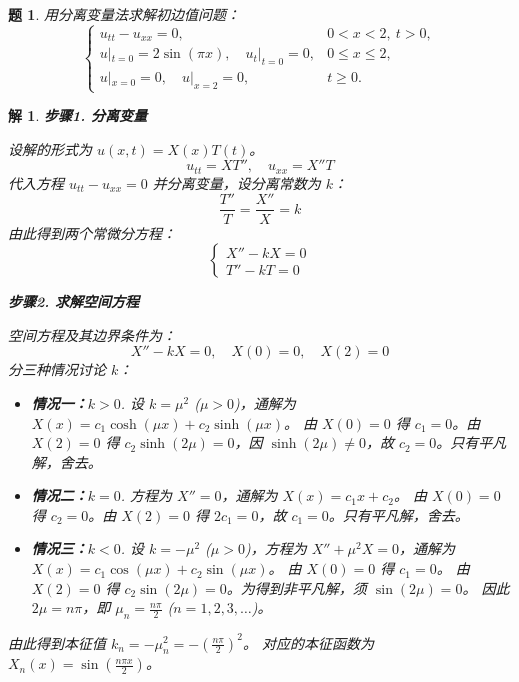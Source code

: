 \documentclass[12pt,a4paper]{article}
\newtheorem{problem}{题}
\newtheorem*{solution}{解}
\begin{document}
	\newpage
	\begin{problem}
		用分离变量法求解初边值问题：
		\[
		\begin{cases}
			u_{tt} - u_{xx} = 0, & 0 < x < 2, \ t > 0, \\[6pt]
			u|_{t=0} = 2\sin(\pi x), \quad u_t|_{t=0} = 0, & 0 \leq x \leq 2, \\[6pt]
			u|_{x=0} = 0, \quad u|_{x=2} = 0, & t \geq 0.
		\end{cases}
		\]
	\end{problem}
		\hrulefill
	\begin{solution}
	\textbf{步骤1. 分离变量}
	
设解的形式为 $u(x,t) = X(x)T(t)$。
\[
u_{tt} = X T'', \quad u_{xx} = X'' T
\]
代入方程 $u_{tt} - u_{xx} = 0$ 并分离变量，设分离常数为 $k$：
\[
\frac{T''}{T} = \frac{X''}{X} = k
\]
由此得到两个常微分方程：
\[
\begin{cases}
	X'' - kX = 0 \\
	T'' - kT = 0
\end{cases}
\]

\hrulefill

\textbf{步骤2. 求解空间方程}

空间方程及其边界条件为：
\[
X'' - kX = 0, \quad X(0) = 0, \quad X(2) = 0
\]
分三种情况讨论 $k$：

\begin{itemize}
	\item \textbf{情况一：$k > 0$}.
	设 $k = \mu^2$ ($\mu>0$)，通解为 $X(x) = c_1 \cosh(\mu x) + c_2 \sinh(\mu x)$。
	由 $X(0)=0$ 得 $c_1=0$。由 $X(2)=0$ 得 $c_2 \sinh(2\mu) = 0$，因 $\sinh(2\mu) \neq 0$，故 $c_2=0$。只有平凡解，舍去。
	
	\item \textbf{情况二：$k = 0$}.
	方程为 $X''=0$，通解为 $X(x) = c_1 x + c_2$。
	由 $X(0)=0$ 得 $c_2=0$。由 $X(2)=0$ 得 $2c_1=0$，故 $c_1=0$。只有平凡解，舍去。
	
	\item \textbf{情况三：$k < 0$}.
	设 $k = -\mu^2$ ($\mu>0$)，方程为 $X'' + \mu^2 X = 0$，通解为 $X(x) = c_1 \cos(\mu x) + c_2 \sin(\mu x)$。
	由 $X(0)=0$ 得 $c_1=0$。
	由 $X(2)=0$ 得 $c_2 \sin(2\mu) = 0$。为得到非平凡解，须 $\sin(2\mu)=0$。
	因此 $2\mu = n\pi$，即 $\mu_n = \frac{n\pi}{2}$ ($n=1, 2, 3, \dots$)。
\end{itemize}
由此得到本征值 $k_n = -\mu_n^2 = -\left(\frac{n\pi}{2}\right)^2$。
对应的本征函数为 $X_n(x) = \sin\left(\frac{n\pi x}{2}\right)$。


\end{solution}
\end{document}
